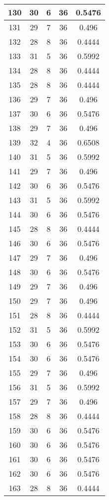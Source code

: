 \documentclass[letterpaper, 12pt]{article}
\begin{document}
\begin{longtable}{|c|c|c|c|c|}
\hline
130 & 30 & 6 & 36 & 0.5476 \\
\hline
131 & 29 & 7 & 36 & 0.496 \\
\hline
132 & 28 & 8 & 36 & 0.4444 \\
\hline
133 & 31 & 5 & 36 & 0.5992 \\
\hline
134 & 28 & 8 & 36 & 0.4444 \\
\hline
135 & 28 & 8 & 36 & 0.4444 \\
\hline
136 & 29 & 7 & 36 & 0.496 \\
\hline
137 & 30 & 6 & 36 & 0.5476 \\
\hline
138 & 29 & 7 & 36 & 0.496 \\
\hline
139 & 32 & 4 & 36 & 0.6508 \\
\hline
140 & 31 & 5 & 36 & 0.5992 \\
\hline
141 & 29 & 7 & 36 & 0.496 \\
\hline
142 & 30 & 6 & 36 & 0.5476 \\
\hline
143 & 31 & 5 & 36 & 0.5992 \\
\hline
144 & 30 & 6 & 36 & 0.5476 \\
\hline
145 & 28 & 8 & 36 & 0.4444 \\
\hline
146 & 30 & 6 & 36 & 0.5476 \\
\hline
147 & 29 & 7 & 36 & 0.496 \\
\hline
148 & 30 & 6 & 36 & 0.5476 \\
\hline
149 & 29 & 7 & 36 & 0.496 \\
\hline
150 & 29 & 7 & 36 & 0.496 \\
\hline
151 & 28 & 8 & 36 & 0.4444 \\
\hline
152 & 31 & 5 & 36 & 0.5992 \\
\hline
153 & 30 & 6 & 36 & 0.5476 \\
\hline
154 & 30 & 6 & 36 & 0.5476 \\
\hline
155 & 29 & 7 & 36 & 0.496 \\
\hline
156 & 31 & 5 & 36 & 0.5992 \\
\hline
157 & 29 & 7 & 36 & 0.496 \\
\hline
158 & 28 & 8 & 36 & 0.4444 \\
\hline
159 & 30 & 6 & 36 & 0.5476 \\
\hline
160 & 30 & 6 & 36 & 0.5476 \\
\hline
161 & 30 & 6 & 36 & 0.5476 \\
\hline
162 & 30 & 6 & 36 & 0.5476 \\
\hline
163 & 28 & 8 & 36 & 0.4444 \\

\end{longtable}
\end{document}
